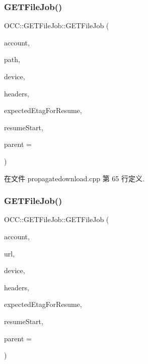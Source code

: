 \subsubsection{\texorpdfstring{G\+E\+T\+File\+Job()}{GETFileJob()}\hspace{0.1cm}{\footnotesize\ttfamily [1/2]}}
{\footnotesize\ttfamily O\+C\+C\+::\+G\+E\+T\+File\+Job\+::\+G\+E\+T\+File\+Job (\begin{DoxyParamCaption}\item[{\hyperlink{namespace_o_c_c_a848616aedb9188e223c6b9867757fe69}{Account\+Ptr}}]{account,  }\item[{const Q\+String \&}]{path,  }\item[{Q\+File $\ast$}]{device,  }\item[{const Q\+Map$<$ Q\+Byte\+Array, Q\+Byte\+Array $>$ \&}]{headers,  }\item[{const Q\+Byte\+Array \&}]{expected\+Etag\+For\+Resume,  }\item[{quint64}]{resume\+Start,  }\item[{Q\+Object $\ast$}]{parent = {} }\end{DoxyParamCaption})\hspace{0.3cm}{\ttfamily [explicit]}}



在文件 propagatedownload.\+cpp 第 65 行定义.

\mbox{\label{class_o_c_c_1_1_g_e_t_file_job_a9fe65b419f36288b844d91f398137b20}} 
\subsubsection{\texorpdfstring{G\+E\+T\+File\+Job()}{GETFileJob()}\hspace{0.1cm}{\footnotesize\ttfamily [2/2]}}
{\footnotesize\ttfamily O\+C\+C\+::\+G\+E\+T\+File\+Job\+::\+G\+E\+T\+File\+Job (\begin{DoxyParamCaption}\item[{\hyperlink{namespace_o_c_c_a848616aedb9188e223c6b9867757fe69}{Account\+Ptr}}]{account,  }\item[{const Q\+Url \&}]{url,  }\item[{Q\+File $\ast$}]{device,  }\item[{const Q\+Map$<$ Q\+Byte\+Array, Q\+Byte\+Array $>$ \&}]{headers,  }\item[{const Q\+Byte\+Array \&}]{expected\+Etag\+For\+Resume,  }\item[{quint64}]{resume\+Start,  }\item[{Q\+Object $\ast$}]{parent = {} }\end{DoxyParamCaption})\hspace{0.3cm}{\ttfamily [explicit]}}



